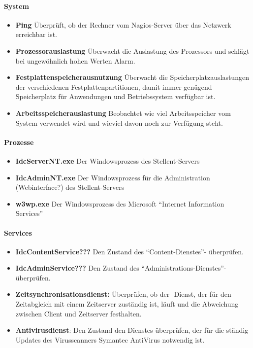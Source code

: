 \paragraph{System}
\begin{itemize}
\item \textbf{Ping} Überprüft, ob der Rechner vom Nagios-Server über das Netzwerk erreichbar ist.
\item \textbf{Prozessorauslastung} Überwacht die Auslastung des Prozessors und schlägt bei ungewöhnlich hohen Werten Alarm.
\item \textbf{Festplattenspeicherausnutzung} Überwacht die Speicherplatzauslastungen der verschiedenen Festplattenpartitionen, damit immer genügend Speicherplatz für Anwendungen und Betriebssystem verfügbar ist.
\item \textbf{Arbeitsspeicherauslastung} Beobachtet wie viel Arbeitsspeicher vom System verwendet wird und wieviel davon noch zur Verfügung steht.
\end{itemize}

\paragraph{Prozesse}
\begin{itemize}
\item \textbf{IdcServerNT.exe} Der Windowsprozess des Stellent-Servers
\item \textbf{IdcAdminNT.exe} Der Windowsprozess für die Administration (Webinterface?) des Stellent-Servers
\item \textbf{w3wp.exe} Der Windowsprozess des Microsoft "`Internet Information Services"'
\end{itemize}

\paragraph{Services}
\begin{itemize}
\item \textbf{IdcContentService???}  Den Zustand des "`Content-Dienstes"'- überprüfen.
\item \textbf{IdcAdminService???}  Den Zustand des "`Administrations-Dienstes"'- überprüfen.
\item \textbf{Zeitsynchronisationsdienst:} Überprüfen, ob der -Dienst, der für den Zeitabgleich mit einem Zeitserver zuständig ist, läuft und die Abweichung zwischen Client und Zeitserver festhalten.
\item \textbf{Antivirusdienst}: Den Zustand den Dienstes überprüfen, der für die ständig Updates des Virusscanners Symantec AntiVirus notwendig ist.
\end{itemize}

